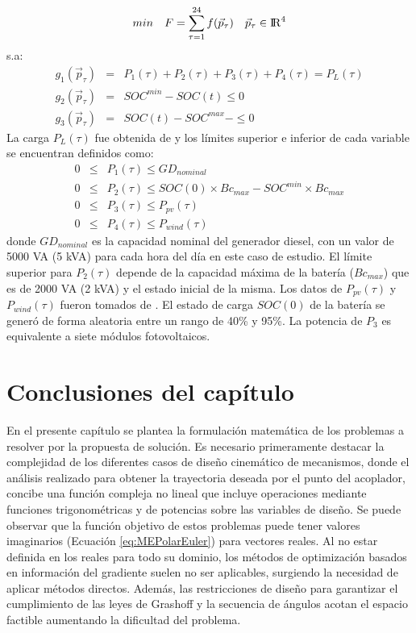 \begin{equation}\label{eq:MR-FO3}
 min\quad  F=
 \sum_{\tau=1}^{24}f(\vec{p}_\tau) \quad \vec{p}_\tau \in {\rm I\!R}^{4}
 \end{equation}
 s.a:
\begin{eqnarray}\label{eq:Restricciones MR}
g_1(\vec{p}_\tau)&=&P_1(\tau)+P_2(\tau)+P_3(\tau)+P_4(\tau)=P_L(\tau)\\
g_2(\vec{p}_\tau)&=&SOC^{min}-SOC(t)\leq 0 \\
g_3(\vec{p}_\tau)&=&SOC(t)-SOC^{max}-\leq 0 
\end{eqnarray}
La carga $P_L(\tau)$ fue obtenida de \cite{tazvinga2014energy} y los límites superior e inferior de cada variable se encuentran definidos como:
\begin{eqnarray}\label{eq:Restricciones MR3}
0  & \leq & P_1(\tau)   \leq  GD_{nominal} \\
0  & \leq & P_2(\tau)   \leq  SOC(0) \times Bc_{max}-  SOC^{min} \times  Bc_{max}\\
0  & \leq & P_3(\tau)   \leq  P_{pv}( \tau) \\
0  & \leq & P_4(\tau)   \leq  P_{wind}(\tau )  \label{eq:ultima restriccion MR}
\end{eqnarray}
donde $GD_{nominal}$ es la capacidad nominal del generador diesel, con un valor de 5000 VA (5 kVA) para cada hora del día en este caso de estudio. El límite superior para $ P_2(\tau)$ depende de la capacidad máxima de la batería ($Bc_{max}$) que es de 2000 VA (2 kVA) y el estado inicial de la misma. Los datos de $ P_{pv}( \tau)$ y $ P_{wind}(\tau )$  fueron tomados de \cite{Ramabhotla_Economic_dispatch}. El estado de carga $SOC(0)$ de la batería se generó de forma aleatoria entre un rango de 40\% y 95\%. La potencia de $P_3$ es equivalente a siete módulos fotovoltaicos.				
	
						


\section{Conclusiones del capítulo}
En el presente capítulo se plantea la formulación matemática de los problemas a resolver por la propuesta de solución. Es necesario primeramente destacar la complejidad de los diferentes casos de diseño cinemático de mecanismos, donde el análisis realizado para obtener la trayectoria deseada por el punto del acoplador, concibe una función compleja no lineal que incluye operaciones mediante funciones trigonométricas y de potencias sobre las variables de diseño. Se puede observar que la función objetivo de estos problemas puede tener valores imaginarios (Ecuación \ref{eq:MEPolarEuler}) para vectores reales. Al no estar definida en los reales para todo su dominio, los métodos de optimización basados en información del gradiente suelen no ser aplicables, surgiendo la necesidad de aplicar métodos directos. Además, las restricciones de diseño para garantizar el cumplimiento de las leyes de Grashoff y la secuencia de ángulos acotan el espacio factible aumentando la dificultad del problema. 

